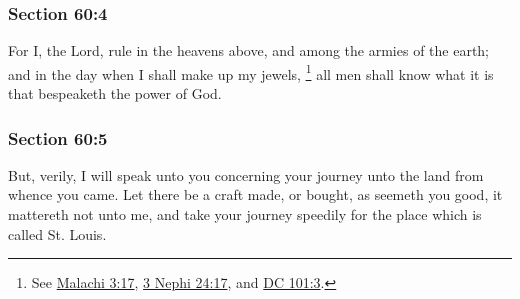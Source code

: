 
	\subsubsection{Section 60:4} %
		\label{DC60-4}

		For I, the Lord, rule in the heavens above, and among the armies of the earth; and in the day when I shall make up my jewels,%
			\footnote{%
				See \hyperref[MALACHI-3-17]{Malachi 3:17}, \hyperref[3NEPHI-24-17]{3 Nephi 24:17}, and \hyperref[DC101-3]{DC 101:3}.
				}
		all men shall know what it is that bespeaketh the power of God.


	\subsubsection{Section 60:5} %
		\label{DC60-5}

		But, verily, I will speak unto you concerning your journey unto the land from whence you came.  Let there be a craft made, or bought, as seemeth you good, it mattereth not unto me, and take your journey speedily for the place which is called St. Louis.



